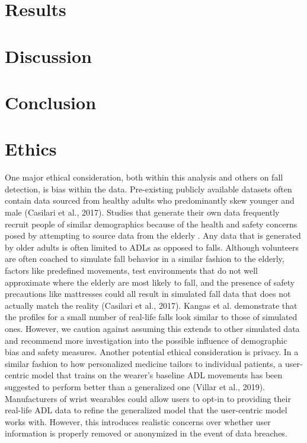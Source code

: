 \documentclass{llncs}
\begin{document}
\section{Results}
\section{Discussion}
\section{Conclusion}

\section{Ethics}

     One major ethical consideration, both within this analysis and others on fall detection, is bias within the data. Pre-existing publicly available datasets often contain data sourced from healthy adults who predominantly skew younger and male (Casilari et al., 2017).\cite{casilari2017analysis} Studies that generate their own data frequently recruit people of similar demographics because of the health and safety concerns posed by attempting to source data from the elderly \cite{gjoreski2016accurately}. Any data that is generated by older adults is often limited to ADLs as opposed to falls. Although volunteers are often coached to simulate fall behavior in a similar fashion to the elderly, factors like predefined movements, test environments that do not well approximate where the elderly are most likely to fall, and the presence of safety precautions like mattresses could all result in simulated fall data that does not actually match the reality (Casilari et al., 2017).\cite{casilari2017analysis} Kangas et al. demonstrate that the profiles for a small number of real-life falls look similar to those of simulated ones.\cite{kangas2008comparison} However, we caution against assuming this extends to other simulated data and recommend more investigation into the possible influence of demographic bias and safety measures.
	Another potential ethical consideration is privacy. In a similar fashion to how personalized medicine tailors to individual patients, a user-centric model that trains on the wearer's baseline ADL movements has been suggested to perform better than a generalized one (Villar et al., 2019).\cite{villar2019online} Manufacturers of wrist wearables could allow users to opt-in to providing their real-life ADL data to refine the generalized model that the user-centric model works with. However, this introduces realistic concerns over whether user information is properly removed or anonymized in the event of data breaches.




%
%


 {}
 

\end{document}
